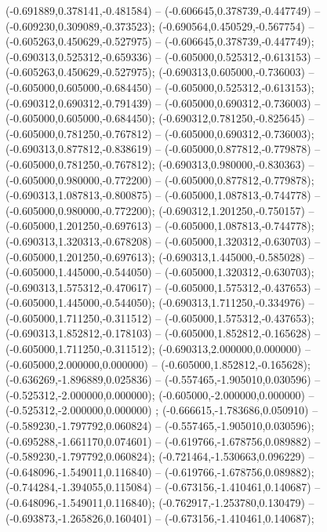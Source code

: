  (-0.691889,0.378141,-0.481584) -- (-0.606645,0.378739,-0.447749) -- (-0.609230,0.309089,-0.373523);
 (-0.690564,0.450529,-0.567754) -- (-0.605263,0.450629,-0.527975) -- (-0.606645,0.378739,-0.447749);
 (-0.690313,0.525312,-0.659336) -- (-0.605000,0.525312,-0.613153) -- (-0.605263,0.450629,-0.527975);
 (-0.690313,0.605000,-0.736003) -- (-0.605000,0.605000,-0.684450) -- (-0.605000,0.525312,-0.613153);
 (-0.690312,0.690312,-0.791439) -- (-0.605000,0.690312,-0.736003) -- (-0.605000,0.605000,-0.684450);
 (-0.690312,0.781250,-0.825645) -- (-0.605000,0.781250,-0.767812) -- (-0.605000,0.690312,-0.736003);
 (-0.690313,0.877812,-0.838619) -- (-0.605000,0.877812,-0.779878) -- (-0.605000,0.781250,-0.767812);
 (-0.690313,0.980000,-0.830363) -- (-0.605000,0.980000,-0.772200) -- (-0.605000,0.877812,-0.779878);
 (-0.690313,1.087813,-0.800875) -- (-0.605000,1.087813,-0.744778) -- (-0.605000,0.980000,-0.772200);
 (-0.690312,1.201250,-0.750157) -- (-0.605000,1.201250,-0.697613) -- (-0.605000,1.087813,-0.744778);
 (-0.690313,1.320313,-0.678208) -- (-0.605000,1.320312,-0.630703) -- (-0.605000,1.201250,-0.697613);
 (-0.690313,1.445000,-0.585028) -- (-0.605000,1.445000,-0.544050) -- (-0.605000,1.320312,-0.630703);
 (-0.690313,1.575312,-0.470617) -- (-0.605000,1.575312,-0.437653) -- (-0.605000,1.445000,-0.544050);
 (-0.690313,1.711250,-0.334976) -- (-0.605000,1.711250,-0.311512) -- (-0.605000,1.575312,-0.437653);
 (-0.690313,1.852812,-0.178103) -- (-0.605000,1.852812,-0.165628) -- (-0.605000,1.711250,-0.311512);
 (-0.690313,2.000000,0.000000) -- (-0.605000,2.000000,0.000000) -- (-0.605000,1.852812,-0.165628);
 (-0.636269,-1.896889,0.025836) -- (-0.557465,-1.905010,0.030596) -- (-0.525312,-2.000000,0.000000);
 (-0.605000,-2.000000,0.000000) -- (-0.525312,-2.000000,0.000000) ;
 (-0.666615,-1.783686,0.050910) -- (-0.589230,-1.797792,0.060824) -- (-0.557465,-1.905010,0.030596);
 (-0.695288,-1.661170,0.074601) -- (-0.619766,-1.678756,0.089882) -- (-0.589230,-1.797792,0.060824);
 (-0.721464,-1.530663,0.096229) -- (-0.648096,-1.549011,0.116840) -- (-0.619766,-1.678756,0.089882);
 (-0.744284,-1.394055,0.115084) -- (-0.673156,-1.410461,0.140687) -- (-0.648096,-1.549011,0.116840);
 (-0.762917,-1.253780,0.130479) -- (-0.693873,-1.265826,0.160401) -- (-0.673156,-1.410461,0.140687);
